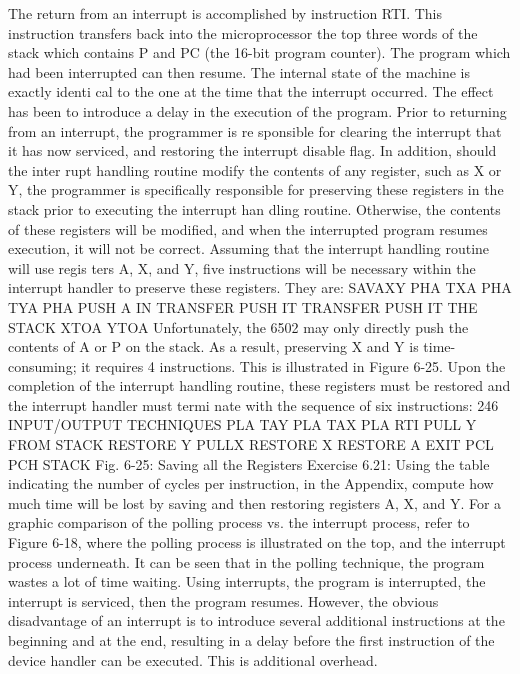 The return from an interrupt is accomplished by instruction
RTI. This instruction transfers back into the microprocessor the
top three words of the stack which contains P and PC (the 16-bit
program counter). The program which had been interrupted can
then resume. The internal state of the machine is exactly identi
cal to the one at the time that the interrupt occurred. The effect
has been to introduce a delay in the execution of the program.
Prior to returning from an interrupt, the programmer is re
sponsible for clearing the interrupt that it has now serviced, and
restoring the interrupt disable flag. In addition, should the inter
rupt handling routine modify the contents of any register, such as
X or Y, the programmer is specifically responsible for preserving
these registers in the stack prior to executing the interrupt han
dling routine. Otherwise, the contents of these registers will be
modified, and when the interrupted program resumes execution,
it will not be correct.
Assuming that the interrupt handling routine will use regis
ters A, X, and Y, five instructions will be necessary within the
interrupt handler to preserve these registers. They are:
SAVAXY PHA
TXA
PHA
TYA
PHA
PUSH A IN
TRANSFER
PUSH IT
TRANSFER
PUSH IT
THE STACK
XTOA
YTOA
Unfortunately, the 6502 may only directly push the contents of A or
P on the stack. As a result, preserving X and Y is time-consuming; it
requires 4 instructions. This is illustrated in Figure 6-25.
Upon the completion of the interrupt handling routine, these
registers must be restored and the interrupt handler must termi
nate with the sequence of six instructions:
246
INPUT/OUTPUT TECHNIQUES
PLA
TAY
PLA
TAX
PLA
RTI
PULL Y FROM STACK
RESTORE Y
PULLX
RESTORE X
RESTORE A
EXIT
PCL
PCH
STACK
Fig. 6-25: Saving all the Registers
Exercise 6.21: Using the table indicating the number of cycles
per instruction, in the Appendix, compute how much time will be
lost by saving and then restoring registers A, X, and Y.
For a graphic comparison of the polling process vs. the interrupt
process, refer to Figure 6-18, where the polling process is illustrated
on the top, and the interrupt process underneath. It can be seen that
in the polling technique, the program wastes a lot of time waiting.
Using interrupts, the program is interrupted, the interrupt is serviced,
then the program resumes. However, the obvious disadvantage of an
interrupt is to introduce several additional instructions at the beginning
and at the end, resulting in a delay before the first instruction of the
device handler can be executed. This is additional overhead.
